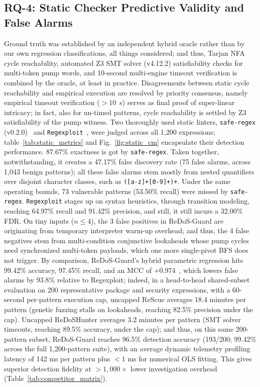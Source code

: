 \documentclass{ieeeaccess}
\begin{document}
\subsection{RQ-4: Static Checker Predictive Validity and False Alarms}
Ground truth was established by an independent hybrid oracle rather than by our own regression classifications, all things considered; and thus, Tarjan NFA cycle reachability, automated Z3 SMT solver (v4.12.2) satisfiability checks for multi-token pump words, and 10-second multi-engine timeout verification is combined by the oracle, at least in practice. Disagreements between static cycle reachability and empirical execution are resolved by priority consensus, namely empirical timeout verification ($>10$~s) serves as final proof of super-linear intricacy; in fact, also for un-timed patterns, cycle reachability is settled by Z3 satisfiability of the pump witness. Two thoroughly used static linters, \texttt{safe-regex} (v0.2.0)~\cite{safe_regex2023} and \texttt{Regexploit}~\cite{regexploit2021}, were judged across all 1,200 expressions; table~\ref{tab:static_metrics} and Fig.~\ref{fig:static_cm} encapsulate their detection performance. 87.67\% exactness is got by \texttt{safe-regex}. Taken together, notwithstanding, it creates a 47.17\% false discovery rate (75 false alarms, across 1,043 benign patterns); all these false alarms stem mostly from nested quantifiers over disjoint character classes, such as \texttt{([a-z]+[0-9]+)+}. Under the same operating bounds, 73 vulnerable patterns (53.50\% recall) were missed by \texttt{safe-regex}. \texttt{Regexploit} stages up on syntax heuristics, through transition modeling, reaching 64.97\% recall and 91.42\% precision, and still, it still incurs a 32.00\% FDR. On tiny inputs ($n \le 4$), the 3 false positives in ReDoS-Guard are originating from temporary interpreter warm-up overhead; and thus, the 4 false negatives stem from multi-condition conjunctive lookaheads whose pump cycles need synchronized multi-token payloads, which one more single-pivot BFS does not trigger. By comparison, ReDoS-Guard's hybrid parametric regression hits 99.42\% accuracy, 97.45\% recall, and an MCC of +0.974~\cite{matthews1975comparison}, which lowers false alarms by 93.8\% relative to Regexploit; indeed, in a head-to-head shared-subset evaluation on 200 representative package and security expressions, with a 60-second per-pattern execution cap, uncapped ReScue averages 18.4 minutes per pattern (genetic fuzzing stalls on lookaheads, reaching 82.5\% precision under the cap). Uncapped ReDoSHunter averages 3.2 minutes per pattern (SMT solver timeouts, reaching 89.5\% accuracy, under the cap); and thus, on this same 200-pattern subset, ReDoS-Guard reaches 96.5\% detection accuracy (193/200; 99.42\% across the full 1,200-pattern suite), with an average dynamic telemetry profiling latency of 142 ms per pattern plus $<1$ ms for numerical OLS fitting. This gives superior detection fidelity at $>1{,}000\times$ lower investigation overhead (Table~\ref{tab:competitor_matrix}).
\end{document}
